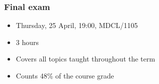 % 
% 	
% 
% 	
% 
% 	
% 
% 	
% 

\begin{frame}\frametitle{Final exam}
	\begin{itemize}
		\item	Thursday, 25 April, 19:00, MDCL/1105
		\item	3 hours 
		\item	Covers all topics taught throughout the term
		\item	Counts 48\% of the course grade
	\end{itemize}
\end{frame}

